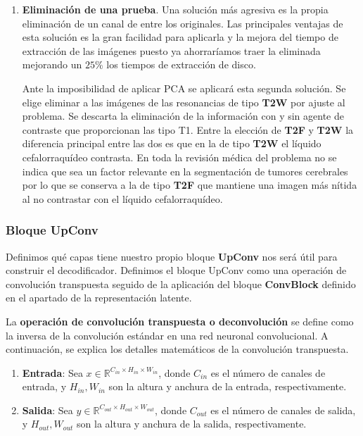\begin{enumerate}
	\item \textbf{Eliminación de una prueba}. Una solución más agresiva es la propia eliminación de un canal de entre los originales. Las principales ventajas de esta solución es la gran facilidad para aplicarla y la mejora del tiempo de extracción de las imágenes puesto ya ahorraríamos traer la eliminada mejorando un $25 \%$ los tiempos de extracción de disco. 
	
	Ante la imposibilidad de aplicar PCA se aplicará esta segunda solución. Se elige eliminar a las imágenes de las resonancias de tipo \textbf{T2W} por ajuste al problema. Se descarta la eliminación de la información con y sin agente de contraste que proporcionan las tipo T1. Entre la elección de \textbf{T2F} y \textbf{T2W} la diferencia principal entre las dos es que en la de tipo \textbf{T2W} el líquido cefalorraquídeo contrasta. En toda la revisión médica del problema no se indica que sea un factor relevante en la segmentación de tumores cerebrales por lo que se conserva a la de tipo \textbf{T2F} que mantiene una imagen más nítida al no contrastar con el líquido cefalorraquídeo.
	
\end{enumerate}

\subsubsection{Bloque UpConv}

Definimos qué capas tiene nuestro propio bloque \textbf{UpConv} nos será útil para construir el decodificador. Definimos el bloque UpConv como una operación de convolución transpuesta seguido de la aplicación del bloque \textbf{ConvBlock} definido en el apartado de la representación latente.

La \textbf{operación de convolución transpuesta o deconvolución} se define como la inversa de la convolución estándar en una red neuronal convolucional. A continuación, se explica los detalles matemáticos de la convolución transpuesta.

\begin{enumerate}
	\item \textbf{Entrada}: Sea \( x \in \mathbb{R}^{C_{in} \times H_{in} \times W_{in}} \), donde \( C_{in} \) es el número de canales de entrada, y \( H_{in}, W_{in} \) son la altura y anchura de la entrada, respectivamente.
	
	\item \textbf{Salida}: Sea \( y \in \mathbb{R}^{C_{out} \times H_{out} \times W_{out}} \), donde \( C_{out} \) es el número de canales de salida, y \( H_{out}, W_{out} \) son la altura y anchura de la salida, respectivamente.
\end{enumerate}


